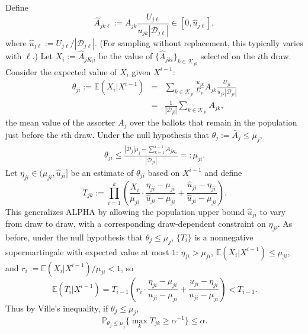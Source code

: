 \documentclass[12pt,runningheads]{llncs}
\newcommand{\cD}{\ensuremath{\mathcal{D}}}
\newcommand{\mc}[1]{\ensuremath{\mathcal{#1}}}
\newcommand{\EE}{\mathbb{E}}
\renewcommand{\Pr}{\mathbb{P}}
\begin{document}
{Define
\begin{equation}
    \hat{A}_{jk\ell} := A_{jk} \frac{U_{j\ell}}{u_{jk}|\cD_{j\ell}|} \in [0, \hat{u}_{j\ell}],
\end{equation}
where $\hat{u}_{j\ell} := U_{j\ell}/|\cD_{j\ell}|$.
(For sampling without replacement, this typically varies with $\ell$.)
Let $X_i := \hat{A}_{jK_ii}$ be the value of $\{ \hat{A}_{jki}\}_{k \in \mc{K}_{jk}}$ selected on the $i$th draw.
Consider the expected value of $X_i$ given $X^{i-1}$:
\begin{eqnarray}
    \theta_{ji} := \mathbb{E} (X_i | X^{i-1} ) 
    &=&  \sum_{k \in \mc{K}_{ji}} \frac{u_{jk}}{U_{ji}} A_{jk} \frac{U_{ji}}{u_{jk}|\cD_{ji}|} \nonumber \\
    &=& \frac{1}{|\cD_{ji}|} \sum_{k \in \mc{K}_{ji}} A_{jk},
\end{eqnarray}
the mean value of the assorter $A_j$ over the ballots that remain in the population just before the $i$th draw.
Under the null hypothesis that $\theta_j := \bar{A}_j \le \mu_j$,
\begin{eqnarray}
  \theta_{ji} \le \frac{|\cD_j| \mu_j - \sum_{k=1}^{i-1} A_{jK_k}}{|\cD_{ji}|} =: \mu_{ji}.
\end{eqnarray}
Let $\eta_{ji} \in (\mu_{ji}, \hat{u}_{ji}]$ be an estimate of $\theta_{ji}$ based on $X^{i-1}$ and define
\begin{equation}
    T_{jk} := \prod_{i=1}^k \left ( \frac{X_i}{\mu_{ji}} \cdot \frac{\eta_{ji}-\mu_{ji}}{\hat{u}_{ji}-\mu_{ji}} +
     \frac{\hat{u}_{ji}-\eta_{ji}}{\hat{u}_{ji}-\mu_{ji}} \right ).
\end{equation}
This generalizes ALPHA by allowing the population upper bound $\hat{u}_{ji}$ to vary from draw to draw, with a corresponding
draw-dependent constraint on $\eta_{ji}$.
As before, under the null hypothesis that $\theta_j \le \mu_j$,
$\{T_i\}$ is a nonnegative supermartingale with expected value at most $1$:
$\eta_{ji} > \mu_{ji}$,
$\EE (X_i | X^{i-1}) \le \mu_{ji}$, and $r_i := \EE (X_i | X^{i-1})/\mu_{ji} < 1$, so
\begin{equation} \label{eq:supermartingale-batch}
    \EE (T_i | X^{i-1} ) = T_{i-1} \left ( r_i \cdot \frac{\eta_{ji}-\mu_{ji}}{u_{ji}-\mu_{ji}} + \frac{u_{ji}-\eta_{ji}}{u_{ji}-\mu_{ji}} \right ) < T_{i-1}.
\end{equation}
Thus by Ville's inequality, if $\theta_j \le \mu_j$,
\begin{equation}
\Pr_{\theta_j \le \mu_j} \{ \max_k T_{jk} \ge \alpha^{-1} \} \le \alpha.
\end{equation}

}
\end{document}
